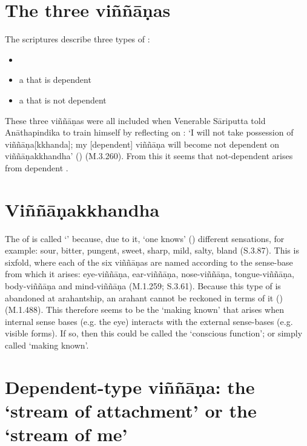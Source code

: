 
\section*{The three vi\~n\~n\=a\d{n}as}

The scriptures describe three types of :

\begin{itemize}
\item {}
\item a  that is dependent
\item a  that is not dependent
\end{itemize}

These three viññāṇas were all included when Venerable Sāriputta told Anāthapindika to train himself by reflecting on : `I will not take possession of viññāṇa[kkhanda]; my [dependent] viññāṇa will become not dependent on viññāṇakkhandha' () (M.3.260). From this it seems that not-dependent  arises from dependent .

\section*{Vi\~n\~n\=a\d{n}akkhandha}

The  of  is called `' because, due to it, `one knows' () different sensations, for example: sour, bitter, pungent, sweet, sharp, mild, salty, bland (S.3.87). This  is sixfold, where each of the six viññāṇas are named according to the sense-base from which it arises: eye-viññāṇa, ear-viññāṇa, nose-viññāṇa, tongue-viññāṇa, body-viññāṇa and mind-viññāṇa (M.1.259; S.3.61). Because this type of  is abandoned at arahantship, an arahant cannot be reckoned in terms of it () (M.1.488). This  therefore seems to be the `making known' that arises when internal sense bases (e.g. the eye) interacts with the external sense-bases (e.g. visible forms). If so, then this  could be called the `conscious function'; or simply called `making known'.

\section*{Dependent-type vi\~n\~n\=a\d{n}a: the `stream of attachment' or the `stream of me'}

